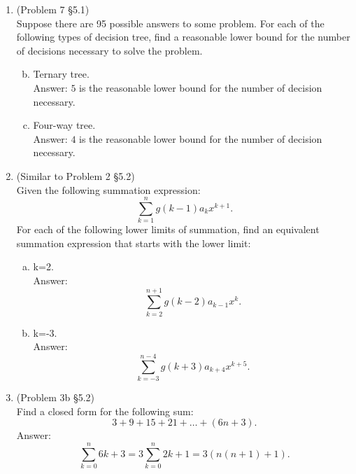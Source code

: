 \documentclass[12pt]{article}
\begin{document}
\begin{enumerate}


\item (Problem 7 \S 5.1)\\
Suppose there are 95 possible answers to some problem. For each of the following types of decision tree, find a reasonable lower bound for the number of decisions necessary to solve the problem.
\begin{enumerate}[a.]
\setcounter{enumii}{1}
\item Ternary tree. \\
Answer: $5$ is the reasonable lower bound for the number of decision necessary.
\item Four-way tree. \\
Answer: $4$ is the reasonable lower bound for the number of decision necessary.
\end{enumerate}









\item (Similar to Problem 2 \S 5.2)\\
Given the following summation expression:
\[\sum_{k=1}^ng(k-1)a_kx^{k+1}.\]
For each of the following lower limits of summation, find an equivalent summation expression that starts with the lower limit:
\begin{enumerate}[a.]
\item k=2. \\
Answer:
 \[\sum_{k=2}^{n+1}g(k-2)a_{k-1}x^{k}.\]

\item k=-3. \\
Answer:
\[\sum_{k=-3}^{n-4}g(k+3)a_{k+4}x^{k+5}.\]
\end{enumerate}














\item (Problem 3b \S 5.2)\\
Find a closed form for the following sum:
\[3+9+15+21+\ldots+(6n+3).\]
Answer:
\[\sum_{k=0}^{n}6k+3 = 3\sum_{k=0}^{n}2k+1 = 3(n(n+1) +1).\]





\end{enumerate}
\end{document}
